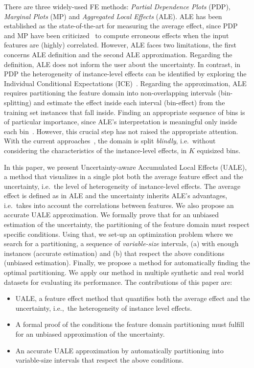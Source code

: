 \documentclass[twoside]{article}
\begin{document}
There are three widely-used FE methods: \emph{Partial Dependence
  Plots} (PDP)\citep{friedman2001greedy}, \emph{Marginal Plots}
(MP)\citep{apley2020visualizing} and \emph{Aggregated Local Effects}
(ALE)\citep{apley2020visualizing}. ALE has been established as the
state-of-the-art for measuring the average effect, since PDP and MP
have been criticized~\citep{Gromping2020MAEP} to compute erroneous
effects when the input features are (highly) correlated. However, ALE
faces two limitations, the first concerns ALE definition and the
second ALE approximation. Regarding the definition, ALE does not
inform the user about the uncertainty. In contrast, in PDP the
heterogeneity of instance-level effects can be identified by exploring
the Individual Conditional Expectations
(ICE)~\citep{goldstein2015peeking}. Regarding the approximation, ALE
requires partitioning the feature domain into non-overlapping
intervals (bin-splitting) and estimate the effect inside each interval
(bin-effect) from the training set instances that fall inside. Finding
an appropriate sequence of bins is of particular importance, since
ALE's interpretation is meaningful only inside each
bin~\citep{molnar2022}. However, this crucial step has not raised the
appropriate attention. With the current
approaches~\citep{apley2020visualizing, gkolemis22}, the domain is
split \emph{blindly}, i.e.~without considering the characteristics of
the instance-level effects, in \(K\) equisized bins.

In this paper, we present Uncertainty-aware Accumulated Local Effects
(UALE), a method that visualizes in a single plot both the average
feature effect and the uncertainty, i.e.~the level of heterogeneity of
instance-level effects. The average effect is defined as in ALE and
the uncertainty inherits ALE's advantages, i.e.~takes into account the
correlations between features. We also propose an accurate UALE
approximation. We formally prove that for an unbiased estimation of
the uncertainty, the partitioning of the feature domain must respect
specific conditions. Using that, we set-up an optimization problem
where we search for a partitioning, a sequence of \emph{variable-size}
intervals, (a) with enough instances (accurate estimation) and (b)
that respect the above conditions (unbiased estimation). Finally, we
propose a method for automatically finding the optimal
partitioning. We apply our method in multiple synthetic and real world
datasets for evaluating its performance. The contributions of this
paper are:

\begin{itemize}
\item UALE, a feature effect method that quantifies both the average
  effect and the uncertainty, i.e.,~the heterogeneity of instance level
  effects.
\item A formal proof of the conditions the feature domain partitioning
  must fulfill for an unbiased approximation of the uncertainty.
\item An accurate UALE approximation by automatically partitioning
  into variable-size intervals that respect the above conditions.
\end{itemize}
\end{document}
